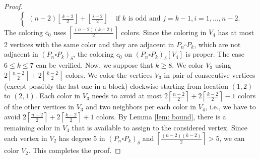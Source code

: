 \documentclass[12pt]{amsart}
\begin{document}
\begin{proof}
\[\begin{cases}
        (n-2)\left\lfloor\frac{k-2}{2}\right\rfloor+\left\lfloor\frac{i-2}{2}\right\rfloor &\text{ if } k \text{ is odd and } j=k-1,i=1,\dots,n-2.
    \end{cases}
    \]
The coloring $c_0$ uses $\left\lceil\frac{(n-2)(k-2)}{2}\right\rceil$ colors.
Since the coloring in $V_4$ has at most 2 vertices with the same color and they are adjacent in $P_n\square P_k$, which are not adjacent in $(P_n\square P_k)_\delta$, the coloring $c_0$ on $(P_n\square P_k)_\delta[V_4]$ is proper.
The case $6\leq k \leq 7$ can be verified.
Now, we suppose that $k\geq 8$. 
We color $V_3$ using $2\left\lceil\frac{n-2}{2}\right\rceil+2\left\lceil\frac{k-2}{2}\right\rceil$ colors.
We color the vertices $V_3$ in pair of consecutive vertices (except possibly the last one in a block) clockwise starting from location $(1,2)$ to $(2,1)$. 
Each color in $V_3$ needs to avoid at most $2\left\lceil\frac{n-2}{2}\right\rceil+2\left\lceil\frac{k-2}{2}\right\rceil -1$ colors of the other vertices in $V_3$ and two neighbors per each color in $V_4$, i.e., we have to avoid $2\left\lceil\frac{n-2}{2}\right\rceil+2\left\lceil\frac{k-2}{2}\right\rceil +1$ colors.
By Lemma \ref{lem: bound}, there is a remaining color in $V_4$ that is available to assign to the considered vertex.
Since each vertex in $V_2$ has degree 5 in $(P_n\square P_k)_\delta$ and $\left\lceil\frac{(n-2)(k-2)}{2}\right\rceil>5$, we can color $V_2$. 
This completes the proof.
\end{proof}
\end{document}
